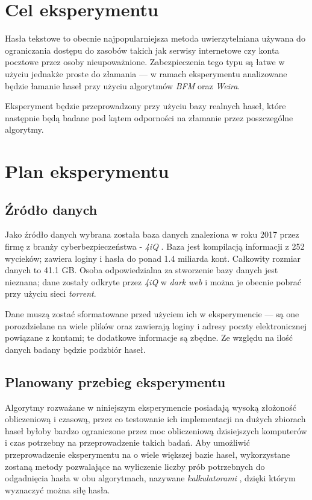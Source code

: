 \documentclass{article}
\begin{document}
	\section{Cel eksperymentu}
	Hasła tekstowe to obecnie najpopularniejsza metoda uwierzytelniana używana do ograniczania dostępu do zasobów takich jak serwisy internetowe czy konta pocztowe przez osoby nieupoważnione. Zabezpieczenia tego typu są łatwe w użyciu jednakże proste do złamania — w ramach eksperymentu analizowane będzie łamanie haseł przy użyciu algorytmów \textit{BFM} oraz \textit{Weira}.
	
	Eksperyment będzie przeprowadzony przy użyciu bazy realnych haseł, które następnie będą badane pod kątem odporności na złamanie przez poszczególne algorytmy.
	
	\section{Plan eksperymentu}
	\subsection{Źródło danych}
	Jako źródło danych wybrana została baza danych znaleziona w roku 2017 przez firmę z branży cyberbezpieczeństwa - \textit{4iQ} \cite{breach}. Baza jest kompilacją informacji z 252 wycieków; zawiera loginy i hasła do ponad 1.4 miliarda kont. Całkowity rozmiar danych to 41.1 GB. Osoba odpowiedzialna za stworzenie bazy danych jest nieznana; dane zostały odkryte przez \textit{4iQ} w \textit{dark web} i można je obecnie pobrać przy użyciu sieci \textit{torrent}.
	
	Dane muszą zostać sformatowane przed użyciem ich w eksperymencie — są one porozdzielane na wiele plików oraz zawierają loginy i adresy poczty elektronicznej powiązane z kontami; te dodatkowe informacje są zbędne. Ze względu na ilość danych badany będzie podzbiór haseł.
	
	\subsection{Planowany przebieg eksperymentu}
	Algorytmy rozważane w niniejszym eksperymencie posiadają wysoką złożoność obliczeniową i czasową, przez co testowanie ich implementacji na dużych zbiorach haseł byłoby bardzo ograniczone przez moc obliczeniową dzisiejszych komputerów i czas potrzebny na przeprowadzenie takich badań. Aby umożliwić przeprowadzenie eksperymentu na o wiele większej bazie haseł, wykorzystane zostaną metody pozwalające na wyliczenie liczby prób potrzebnych do odgadnięcia hasła w obu algorytmach, nazywane \textit{kalkulatorami} \cite{calc}, dzięki którym wyznaczyć można siłę hasła.
	
\end{document}
